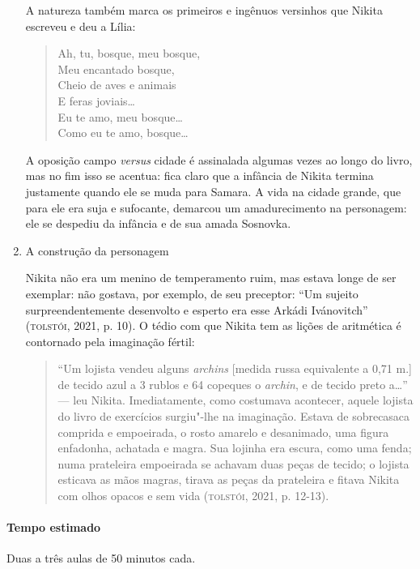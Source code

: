 \documentclass[11pt]{extarticle}
\begin{document}
\begin{enumerate}
A natureza também marca os primeiros e ingênuos versinhos que Nikita
escreveu e deu a Lília:

\begin{verse}
Ah, tu, bosque, meu bosque,\\
Meu encantado bosque,\\
Cheio de aves e animais\\
E feras joviais\ldots{}\\
Eu te amo, meu bosque\ldots{}\\
Como eu te amo, bosque\ldots{}
\end{verse}

A oposição campo \emph{versus} cidade é assinalada algumas vezes ao
longo do livro, mas no fim isso se acentua: fica claro que a infância de
Nikita termina justamente quando ele se muda para Samara. A vida na
cidade grande, que para ele era suja e sufocante, demarcou um
amadurecimento na personagem: ele se despediu da infância e de sua amada
Sosnovka.

\item
A construção da personagem


Nikita não era um menino de temperamento ruim, mas estava longe de ser
exemplar: não gostava, por exemplo, de seu preceptor: ``Um sujeito
surpreendentemente desenvolto e esperto era esse Arkádi Ivánovitch''
(\textsc{tolstói}, 2021, p. 10). O tédio com que Nikita tem as lições de
aritmética é contornado pela imaginação fértil:

\begin{quote}
``Um lojista vendeu alguns \emph{archins} {[}medida russa equivalente a
0,71 m.{]} de tecido azul a 3 rublos e 64 copeques o \emph{archin}, e de
tecido preto a\ldots{}'' --- leu Nikita. Imediatamente, como costumava
acontecer, aquele lojista do livro de exercícios surgiu"-lhe na
imaginação. Estava de sobrecasaca comprida e empoeirada, o rosto amarelo
e desanimado, uma figura enfadonha, achatada e magra. Sua lojinha era
escura, como uma fenda; numa prateleira empoeirada se achavam duas peças
de tecido; o lojista esticava as mãos magras, tirava as peças da
prateleira e fitava Nikita com olhos opacos e sem vida
(\textsc{tolstói}, 2021, p. 12-13).
\end{quote}
\end{enumerate}

\paragraph{Tempo estimado} Duas a três aulas de 50 minutos cada.
\end{document}
